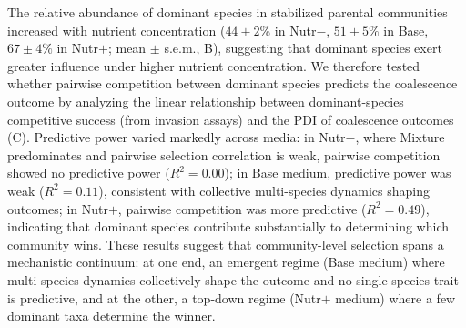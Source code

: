 The relative abundance of dominant species in stabilized parental communities increased with nutrient concentration ($44 \pm 2\%$ in Nutr$-$, $51 \pm 5\%$ in Base, $67 \pm 4\%$ in Nutr$+$; mean $\pm$ s.e.m., B), suggesting that dominant species exert greater influence under higher nutrient concentration. We therefore tested whether pairwise competition between dominant species predicts the coalescence outcome by analyzing the linear relationship between dominant-species competitive success (from invasion assays) and the PDI of coalescence outcomes (C). Predictive power varied markedly across media: in Nutr$-$, where Mixture predominates and pairwise selection correlation is weak, pairwise competition showed no predictive power ($R^2 = 0.00$); in Base medium, predictive power was weak ($R^2 = 0.11$), consistent with collective multi-species dynamics shaping outcomes; in Nutr$+$, pairwise competition was more predictive ($R^2 = 0.49$), indicating that dominant species contribute substantially to determining which community wins. These results suggest that community-level selection spans a mechanistic continuum: at one end, an emergent regime (Base medium) where multi-species dynamics collectively shape the outcome and no single species trait is predictive, and at the other, a top-down regime (Nutr$+$ medium) where a few dominant taxa determine the winner. 

